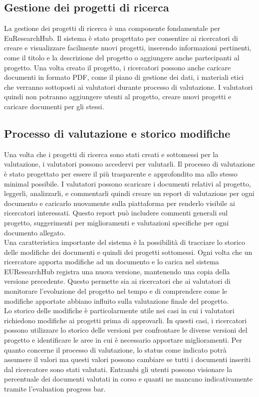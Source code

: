 \documentclass{report}
\begin{document}
\subsection{Gestione dei progetti di ricerca}
La gestione dei progetti di ricerca è una componente fondamentale per EuResearchHub. Il sistema è stato progettato per consentire ai ricercatori di creare e visualizzare facilmente nuovi progetti, inserendo informazioni pertinenti, come il titolo e la descrizione del progetto o aggiungere anche partecipanti al progetto.  Una volta creato il progetto, i ricercatori possono anche caricare documenti in formato PDF, come il piano di gestione dei dati, i materiali etici che verranno sottoposti ai valutatori durante processo di valutazione. I valutatori quindi non potranno aggiungere utenti al progetto, creare nuovi progetti e caricare documenti per gli stessi.\\
\subsection{Processo di valutazione e storico modifiche}
Una volta che i progetti di ricerca sono stati creati e sottomessi per la valutazione, i valutatori possono accedervi per valutarli. Il processo di valutazione è stato progettato per essere il più trasparente e approfondito ma allo stesso minimal possibile. I valutatori possono scaricare i documenti relativi al progetto, leggerli, analizzarli, e commentarli quindi creare un report di valutazione per ogni documento e caricarlo nuovamente sulla piattaforma per renderlo visibile ai ricercatori interessati. Questo report può includere commenti generali sul progetto, suggerimenti per miglioramenti e valutazioni specifiche per ogni documento allegato.\\
Una caratteristica importante del sistema è la possibilità di tracciare lo storico delle modifiche dei documenti e quindi dei progetti sottomessi. Ogni volta che un ricercatore apporta modifiche ad un documento e lo carica nel sistema EUResearchHub registra una nuova versione, mantenendo una copia della versione precedente. Questo permette sia ai ricercatori che ai valutatori di monitorare l'evoluzione del progetto nel tempo e di comprendere come le modifiche apportate abbiano influito sulla valutazione finale del progetto.\\
Lo storico delle modifiche è particolarmente utile nei casi in cui i valutatori richiedono modifiche ai progetti prima di approvarli. In questi casi, i ricercatori possono utilizzare lo storico delle versioni per confrontare le diverse versioni del progetto e identificare le aree in cui è necessario apportare miglioramenti. Per quanto concerne il processo di valutazione,  lo status come indicato potrà assumere il valori ma questi valori possono cambiare se tutti i documenti inseriti dal ricercatore sono stati valutati.  Entrambi gli utenti possono visionare la percentuale dei documenti valutati in corso e quanti ne mancano indicativamente tramite l'evaluation progress bar. 
\end{document}
